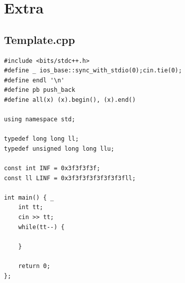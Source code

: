 \documentclass[11pt, a4paper, twoside]{article}
\begin{document}
\pagebreak


%
%

\section{Extra}

\subsection{Template.cpp}
\begin{lstlisting}
#include <bits/stdc++.h>
#define _ ios_base::sync_with_stdio(0);cin.tie(0);
#define endl '\n'
#define pb push_back
#define all(x) (x).begin(), (x).end()

using namespace std;

typedef long long ll;
typedef unsigned long long llu;

const int INF = 0x3f3f3f3f;
const ll LINF = 0x3f3f3f3f3f3f3f3fll;

int main() { _
    int tt;
    cin >> tt;
    while(tt--) {

    } 
    
    return 0;
};
\end{lstlisting}
\end{document}
